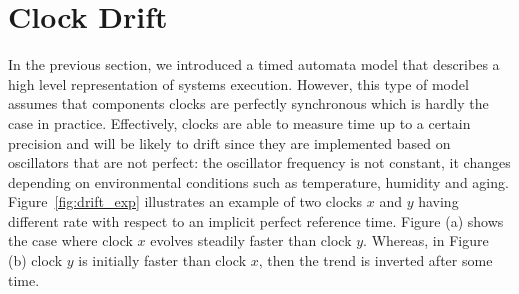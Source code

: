 \chapter{Clock Drift}\label{chap:6}
\minitoc

In the previous section, we introduced a timed automata model that 
describes a high level representation of systems execution. 
However, this type of model assumes that components clocks are perfectly synchronous which is 
hardly the case in practice.
Effectively, clocks are able to measure time up to a certain precision and will be likely
to drift since they are implemented based on oscillators that are not perfect: the oscillator 
frequency is not constant, it changes depending on environmental conditions such as 
temperature, humidity and aging.
Figure~\ref{fig:drift_exp} illustrates an example of two clocks $x$ and $y$ having different rate
with respect to an implicit perfect reference time. Figure (a) shows the case
where clock $x$ evolves steadily faster than clock $y$. Whereas, in Figure (b) 
clock $y$ is initially faster than clock $x$, then the trend is inverted after some time.

